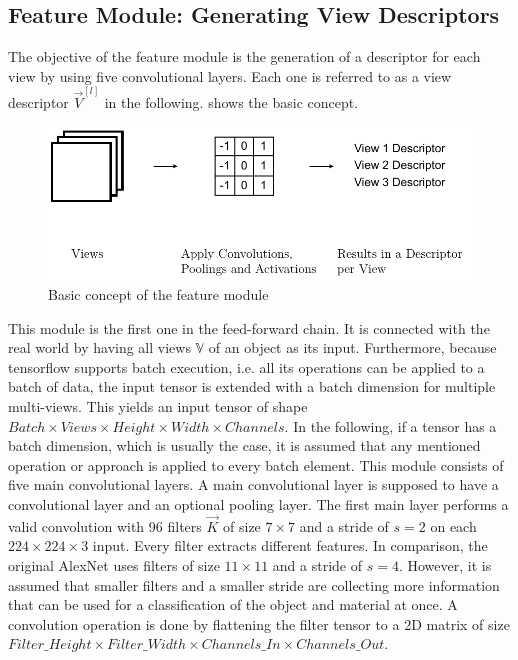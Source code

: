\subsection{Feature Module: Generating View Descriptors}
\label{sec:architecture-feature-module}
The objective of the feature module is the generation of a descriptor for each view by using five convolutional layers.
Each one is referred to as a view descriptor $\vec{V}^{[l]}$ in the following.
 shows the basic concept.
\begin{figure}
	\centering
	\includegraphics[]{images/feature_module.pdf}
	\caption{Basic concept of the feature module}
	\label{fig:feature-module}
\end{figure}
This module is the first one in the feed-forward chain.
It is connected with the real world by having all views $\mathbb{V}$ of an object as its input.
Furthermore, because tensorflow supports batch execution, i.e. all its operations can be applied to a batch of data, the input tensor is extended with a batch dimension for multiple multi-views.
This yields an input tensor of shape $Batch \times Views \times Height \times Width \times Channels$.
In the following, if a tensor has a batch dimension, which is usually the case, it is assumed that any mentioned operation or approach is applied to every batch element.
This module consists of five main convolutional layers.
A main convolutional layer is supposed to have a convolutional layer and an optional pooling layer.
The first main layer performs a valid convolution with 96 filters $\vec{K}$ of size $7 \times 7$ and a stride of $s=2$ on each $224 \times 224 \times 3$ input.
Every filter extracts different features.
In comparison, the original AlexNet uses filters of size $11 \times 11$ and a stride of $s=4$.
However, it is assumed that smaller filters and a smaller stride are collecting more information that can be used for a classification of the object and material at once.
A convolution operation is done by flattening the filter tensor to a 2D matrix of size $Filter\_Height \times Filter\_Width \times Channels\_In \times Channels\_Out$.

